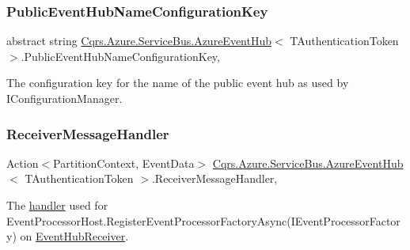 \subsubsection{\texorpdfstring{Public\+Event\+Hub\+Name\+Configuration\+Key}{PublicEventHubNameConfigurationKey}}
{\footnotesize\ttfamily abstract string \hyperlink{classCqrs_1_1Azure_1_1ServiceBus_1_1AzureEventHub}{Cqrs.\+Azure.\+Service\+Bus.\+Azure\+Event\+Hub}$<$ T\+Authentication\+Token $>$.Public\+Event\+Hub\+Name\+Configuration\+Key\hspace{0.3cm}{\ttfamily [get]}, {\ttfamily [protected]}}



The configuration key for the name of the public event hub as used by I\+Configuration\+Manager. 

\mbox{\label{classCqrs_1_1Azure_1_1ServiceBus_1_1AzureEventHub_a8c9faa7096d72a45803e6e63a1b3cf30_a8c9faa7096d72a45803e6e63a1b3cf30}} 
\subsubsection{\texorpdfstring{Receiver\+Message\+Handler}{ReceiverMessageHandler}}
{\footnotesize\ttfamily Action$<$Partition\+Context, Event\+Data$>$ \hyperlink{classCqrs_1_1Azure_1_1ServiceBus_1_1AzureEventHub}{Cqrs.\+Azure.\+Service\+Bus.\+Azure\+Event\+Hub}$<$ T\+Authentication\+Token $>$.Receiver\+Message\+Handler\hspace{0.3cm}{\ttfamily [get]}, {\ttfamily [protected]}}



The \hyperlink{}{handler} used for Event\+Processor\+Host.\+Register\+Event\+Processor\+Factory\+Async(\+I\+Event\+Processor\+Factory) on \hyperlink{classCqrs_1_1Azure_1_1ServiceBus_1_1AzureEventHub_a1b12b47dbb9b9afe2014477a2e457c35_a1b12b47dbb9b9afe2014477a2e457c35}{Event\+Hub\+Receiver}. 

\mbox{\label{classCqrs_1_1Azure_1_1ServiceBus_1_1AzureEventHub_ad3a0c2f32d5771fb1f4420fc33c75968_ad3a0c2f32d5771fb1f4420fc33c75968}} 
